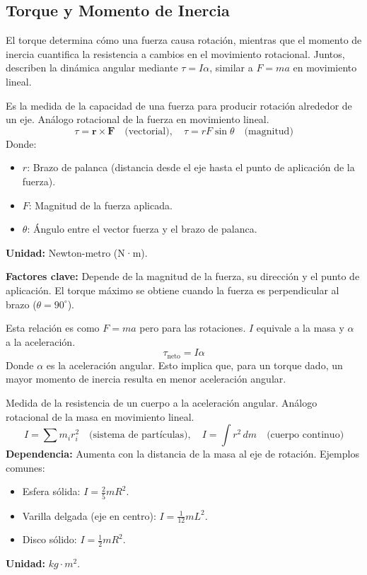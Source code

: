 \subsection{Torque y Momento de Inercia}
\label{sec:torque_y_momento_de_inercia}

El torque determina cómo una fuerza causa rotación, mientras que el momento de inercia cuantifica la resistencia a cambios en el movimiento rotacional. Juntos, describen la dinámica angular mediante \( \tau = I\alpha \), similar a \( F = ma \) en movimiento lineal.

\begin{tcolorbox}[remember, title=Torque (\(\tau\))]
  Es la medida de la capacidad de una fuerza para producir rotación alrededor de un eje. Análogo rotacional de la fuerza en movimiento lineal.  
  \[
    \tau = \mathbf{r} \times \mathbf{F} \quad \text{(vectorial)}, \quad \tau = rF\sin\theta \quad \text{(magnitud)}
  \]  
  Donde:
  \begin{itemize}
    \item \( r \): Brazo de palanca (distancia desde el eje hasta el punto de aplicación de la fuerza).
    \item \( F \): Magnitud de la fuerza aplicada.
    \item \( \theta \): Ángulo entre el vector fuerza y el brazo de palanca.
  \end{itemize}
  \textbf{Unidad:} Newton-metro (N·m).  

  \noindent\textbf{Factores clave:} Depende de la magnitud de la fuerza, su dirección y el punto de aplicación. El torque máximo se obtiene cuando la fuerza es perpendicular al brazo (\( \theta = 90^\circ \)).
\end{tcolorbox}

\begin{tcolorbox}[remember, title=Relación Fundamental (Segunda Ley de Newton para Rotación)]
  Esta relación es como \(F=ma\) pero para las rotaciones. \(I\) equivale a la masa y \(\alpha\) a la aceleración.
  \[
  \tau_{\text{neto}} = I \alpha
  \]  
  Donde \( \alpha \) es la aceleración angular. Esto implica que, para un torque dado, un mayor momento de inercia resulta en menor aceleración angular.
\end{tcolorbox}

\begin{tcolorbox}[remember, title=Momento de Inercia (\(I\))]
  Medida de la resistencia de un cuerpo a la aceleración angular. Análogo rotacional de la masa en movimiento lineal.  
  \[
    I = \sum m_i r_i^2 \quad \text{(sistema de partículas)}, \quad I = \int r^2 \, dm \quad \text{(cuerpo continuo)}
  \]  
  \textbf{Dependencia:} Aumenta con la distancia de la masa al eje de rotación. Ejemplos comunes:
  \begin{itemize}
    \item Esfera sólida: \( I = \frac{2}{5} mR^2 \).
    \item Varilla delgada (eje en centro): \( I = \frac{1}{12} mL^2 \).
    \item Disco sólido: \( I = \frac{1}{2} mR^2 \).
  \end{itemize}
  \textbf{Unidad:} \(kg\cdot m^2\).  
\end{tcolorbox}
